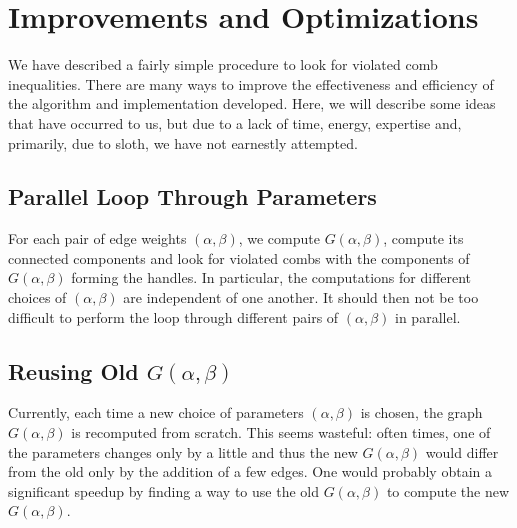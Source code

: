 \documentclass[11pt, letterpaper]{amsart}
\theoremstyle{plain}
\theoremstyle{definition}
\theoremstyle{remark}
\begin{document}
\begin{figure}
\end{figure}
\begin{figure}
\end{figure}
\section{Improvements and Optimizations}\label{sec:opt}
We have described a fairly simple procedure to look for violated comb
inequalities. There are many ways to improve the effectiveness and efficiency
of the algorithm and implementation developed. Here, we will describe some
ideas that have occurred to us, but due to a lack of time, energy, expertise
and, primarily, due to sloth, we have not earnestly attempted.

\subsection{Parallel Loop Through Parameters}
For each pair of edge weights $(\alpha, \beta)$, we compute $G(\alpha,\beta)$,
compute its connected components and look for violated combs with the
components of $G(\alpha,\beta)$ forming the handles. In particular, the
computations for different choices of $(\alpha, \beta)$ are independent of one
another. It should then not be too difficult to perform the loop through
different pairs of $(\alpha,\beta)$ in parallel.

\subsection{Reusing Old $G(\alpha,\beta)$}
Currently, each time a new choice of parameters $(\alpha,\beta)$ is chosen, the
graph $G(\alpha,\beta)$ is recomputed from scratch. This seems wasteful: often times,
one of the parameters changes only by a little and thus the new $G(\alpha,\beta)$
would differ from the old only by the addition of a few edges. One would probably
obtain a significant speedup by finding a way to use the old $G(\alpha,\beta)$
to compute the new $G(\alpha,\beta)$.
\end{document}
